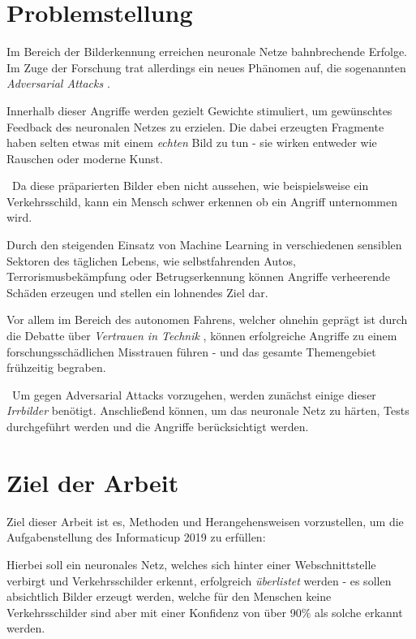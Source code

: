 \section{Problemstellung}
Im Bereich der Bilderkennung erreichen neuronale Netze bahnbrechende Erfolge. Im Zuge der Forschung trat allerdings ein neues Phänomen auf, die sogenannten \textit{Adversarial Attacks} \cite{DBLP:journals/corr/HuangPGDA17}. 

Innerhalb dieser Angriffe werden gezielt Gewichte stimuliert, um gewünschtes Feedback des neuronalen Netzes zu erzielen. Die dabei erzeugten Fragmente haben selten etwas mit einem \textit{echten} Bild zu tun - sie wirken entweder wie Rauschen oder moderne Kunst. 

~\newline Da diese präparierten Bilder eben nicht aussehen, wie beispielsweise ein Verkehrsschild, kann ein Mensch schwer erkennen ob ein Angriff unternommen wird. 

Durch den steigenden Einsatz von Machine Learning in verschiedenen sensiblen Sektoren des täglichen Lebens, wie selbstfahrenden Autos, Terrorismusbekämpfung oder Betrugserkennung können Angriffe verheerende Schäden erzeugen und stellen ein lohnendes Ziel dar. 

Vor allem im Bereich des autonomen Fahrens, welcher ohnehin geprägt ist durch die Debatte über \textit{Vertrauen in Technik} \cite{VertrauenTechnik}, können erfolgreiche Angriffe zu einem forschungsschädlichen Misstrauen führen - und das gesamte Themengebiet frühzeitig begraben. 

~\newline Um gegen Adversarial Attacks vorzugehen, werden zunächst einige dieser \textit{Irrbilder} benötigt. Anschließend können, um das neuronale Netz zu härten, Tests durchgeführt werden und die Angriffe berücksichtigt werden. 


\section{Ziel der Arbeit}
\label{sec:ZielDerArbeit}
Ziel dieser Arbeit ist es, Methoden und Herangehensweisen vorzustellen, um die Aufgabenstellung des Informaticup 2019  zu erfüllen: 

Hierbei soll ein neuronales Netz, welches sich hinter einer Webschnittstelle verbirgt und Verkehrsschilder erkennt, erfolgreich \textit{überlistet} werden - es sollen absichtlich Bilder erzeugt werden, welche für den Menschen keine Verkehrsschilder sind aber mit einer Konfidenz von über 90\% als solche erkannt werden. 

